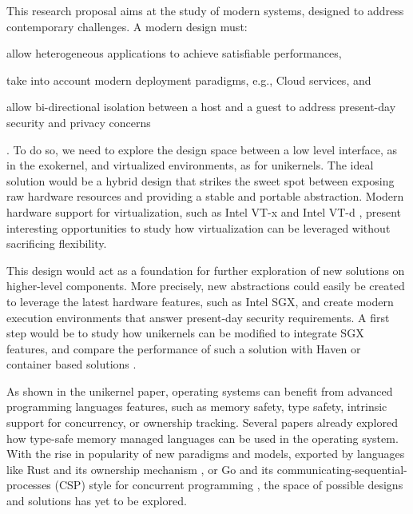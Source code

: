 This research proposal aims at the study of modern systems, designed to address contemporary challenges.
A modern design must:
\begin{enumerate*}
	\item allow heterogeneous applications to achieve satisfiable performances,
	\item take into account modern deployment paradigms, e.g., Cloud services, and 
	\item allow bi-directional isolation between a host and a guest to address present-day security and privacy concerns
\end{enumerate*}.
To do so, we need to explore the design space between a low level interface, as in the exokernel, and virtualized environments, as for unikernels.
The ideal solution would be a hybrid design that strikes the sweet spot between exposing raw hardware resources and providing a stable and portable abstraction.
Modern hardware support for virtualization, such as Intel VT-x \cite{DBLP:journals/computer/UhligNRSMABKLS05} and Intel VT-d \cite{intelVTD}, present interesting opportunities to study how virtualization can be leveraged without sacrificing flexibility.

This design would act as a foundation for further exploration of new solutions on higher-level components. 
More precisely, new abstractions could easily be created to leverage the latest hardware features, such as Intel SGX, and create modern execution environments that answer present-day security requirements.
A first step would be to study how unikernels can be modified to integrate SGX features, and compare the performance of such a solution with Haven or container based solutions \cite{DBLP:conf/osdi/ArnautovTGKMPLM16}.

As shown in the unikernel paper, operating systems can benefit from advanced programming languages features, such as memory safety, type safety, intrinsic support for concurrency, or ownership tracking.
Several papers \cite{DBLP:conf/asplos/MadhavapeddyMRSSGSHC13,DBLP:conf/sosp/BershadSPSFBCE95,DBLP:journals/sigops/HuntL07} already explored how type-safe memory managed languages can be used in the operating system.
With the rise in popularity of new paradigms and models, exported by languages like Rust and its ownership mechanism \cite{rust}, or Go and its communicating-sequential-processes (CSP) style for concurrent programming \cite{golang}, the space of possible designs and solutions has yet to be explored.